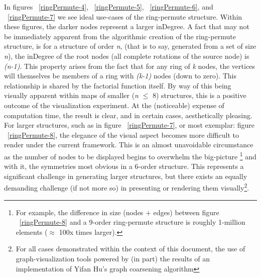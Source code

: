 \documentclass[12pt]{article}
\begin{document}
In figures ~\ref{ringPermute-4}, ~\ref{ringPermute-5}, ~\ref{ringPermute-6}, and ~\ref{ringPermute-7} we see ideal use-cases of the ring-permute structure.
Within these figures, the darker nodes represent a larger inDegree.
A fact that may not be immediately apparent from the algorithmic creation of the ring-permute structure, is for a structure of order \emph{n}, (that is to say, generated from a set of size \emph{n}), the inDegree of the root nodes (all complete rotations of the source node) is \emph{(n-1)}.
This property arises from the fact that for any ring of \emph{k} nodes, the vertices will themselves be members of a ring with \emph{(k-1)} nodes (down to zero).
This relationship is shared by the factorial function itself.
\pagebreak[0]
By way of this being visually apparent within maps of smaller (\emph{n} $\leq$ 8) structures, this is a positive outcome of the visualization experiment.
At the (noticeable) expense of computation time, the result is clear, and in certain cases, aesthetically pleasing.\\

For larger structures, such as in figure ~\ref{ringPermute-7}, or most exemplar: figure ~\ref{ringPermute-8}, the elegance of the visual aspect becomes more difficult to render under the current framework.
This is an almost unavoidable circumstance as the number of nodes to be displayed begins to overwhelm the big-picture \footnote{For example, the difference in size (nodes + edges) between figure ~\ref{ringPermute-8} and a 9-order ring-permute structure is roughly 1-million elements ($\approx$ 100x times larger).} and with it, the symmetries most obvious in a 6-order structure.
This represents a significant challenge in generating larger structures, but there exists an equally demanding challenge (if not more so) in presenting or rendering them visually\footnote{For all cases demonstrated within the context of this document, the use of graph-visualization tools powered by (in part) the results of an implementation of Yifan Hu's graph coarsening algorithm\cite{Hu:2006}}.
\end{document}
